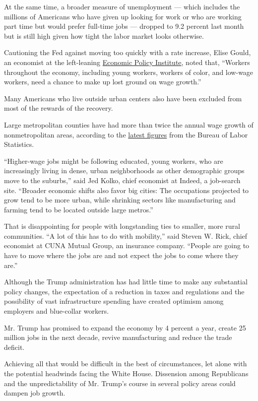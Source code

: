 At the same time, a broader measure of unemployment --- which includes
the millions of Americans who have given up looking for work or who are
working part time but would prefer full-time jobs --- dropped to 9.2
percent last month but is still high given how tight the labor market
looks otherwise.

Cautioning the Fed against moving too quickly with a rate increase,
Elise Gould, an economist at the left-leaning
\href{http://www.epi.org/people/josh-bivens/}{Economic Policy
Institute}, noted that, ``Workers throughout the economy, including
young workers, workers of color, and low-wage workers, need a chance to
make up lost ground on wage growth.''

Many Americans who live outside urban centers also have been excluded
from most of the rewards of the recovery.

Large metropolitan counties have had more than twice the annual wage
growth of nonmetropolitan areas, according to the
\href{https://www.bls.gov/news.release/srgune.nr0.htm}{latest figures}
from the Bureau of Labor Statistics.

``Higher-wage jobs might be following educated, young workers, who are
increasingly living in dense, urban neighborhoods as other demographic
groups move to the suburbs,'' said Jed Kolko, chief economist at Indeed,
a job-search site. ``Broader economic shifts also favor big cities: The
occupations projected to grow tend to be more urban, while shrinking
sectors like manufacturing and farming tend to be located outside large
metros.''

That is disappointing for people with longstanding ties to smaller, more
rural communities. ``A lot of this has to do with mobility,'' said
Steven W. Rick, chief economist at CUNA Mutual Group, an insurance
company. ``People are going to have to move where the jobs are and not
expect the jobs to come where they are.''

Although the Trump administration has had little time to make any
substantial policy changes, the expectation of a reduction in taxes and
regulations and the possibility of vast infrastructure spending have
created optimism among employers and blue-collar workers.

Mr. Trump has promised to expand the economy by 4 percent a year, create
25 million jobs in the next decade, revive manufacturing and reduce the
trade deficit.

Achieving all that would be difficult in the best of circumstances, let
alone with the potential headwinds facing the White House. Dissension
among Republicans and the unpredictability of Mr. Trump's course in
several policy areas could dampen job growth.

